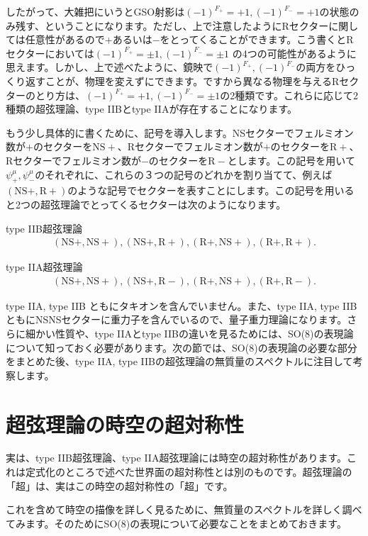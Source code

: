 \documentclass[report,paper=a4, fontsize=12pt, line_length=16cm, number_of_lines=34,dvipdfmx]{jlreq}
\newenvironment{important}{\begin{tcolorbox}[
  colback = white,
  colframe = red!35,
  boxrule = 2mm,
  fonttitle = \bfseries,
  after = \noindent] }{\end{tcolorbox}}
\numberwithin{equation}{chapter}
\numberwithin{equation}{section}
\newcommand{\NSp}{\mathrm{NS}+}
\newcommand{\Rp}{\mathrm{R}+}
\newcommand{\Rm}{\mathrm{R}-}
\begin{document}
したがって、大雑把にいうとGSO射影は$(-1)^{F_{+}}=+1,(-1)^{F_{-}}=+1$の状態のみ残す、ということになります。ただし、上で注意したようにRセクターに関しては任意性があるので$+$あるいは$-$をとってくることができます。こう書くとRセクターにおいては$(-1)^{F_{+}}=\pm 1,(-1)^{F_{-}}=\pm 1$ の4つの可能性があるように思えます。しかし、上で述べたように、鏡映で$(-1)^{F_{+}},(-1)^{F_{-}}$の両方をひっくり返すことが、物理を変えずにできます。ですから異なる物理を与えるRセクターのとり方は、$(-1)^{F_{+}}=+1,(-1)^{F_{-}}=\pm 1$の2種類です。これらに応じて2種類の超弦理論、type IIBとtype IIAが存在することになります。

もう少し具体的に書くために、記号を導入します。NSセクターでフェルミオン数が$+$のセクターを$\NSp$、Rセクターでフェルミオン数が$+$のセクターを$\Rp$、Rセクターでフェルミオン数が$-$のセクターを$\Rm$とします。この記号を用いて$\psi^{\mu}_{+},\psi^{\mu}_{-}$のそれぞれに、これらの３つの記号のどれかを割り当てて、例えば$(\NSp,\Rp)$のような記号でセクターを表すことにします。この記号を用いると2つの超弦理論でとってくるセクターは次のようになります。
\begin{important}
  type IIB超弦理論
  \begin{align}
    (\NSp,\NSp),
    (\NSp,\Rp),
    (\Rp,\NSp),
    (\Rp,\Rp).
  \end{align}
\end{important}
\begin{important}
  type IIA超弦理論
  \begin{align}
    (\NSp,\NSp),
    (\NSp,\Rm),
    (\Rp,\NSp),
    (\Rp,\Rm).
  \end{align}
\end{important}

type IIA, type IIB ともにタキオンを含んでいません。また、type IIA, type IIB ともにNSNSセクターに重力子を含んでいるので、量子重力理論になります。さらに細かい性質や、type IIAとtype IIBの違いを見るためには、SO(8)の表現論について知っておく必要があります。次の節では、SO(8)の表現論の必要な部分をまとめた後、type IIA, type IIBの超弦理論の無質量のスペクトルに注目して考察します。

\section{超弦理論の時空の超対称性}
実は、type IIB超弦理論、type IIA超弦理論には時空の超対称性があります。これは定式化のところで述べた世界面の超対称性とは別のものです。超弦理論の「超」は、実はこの時空の超対称性の「超」です。

これを含めて時空の描像を詳しく見るために、無質量のスペクトルを詳しく調べてみます。そのためにSO(8)の表現について必要なことをまとめておきます。
\end{document}
